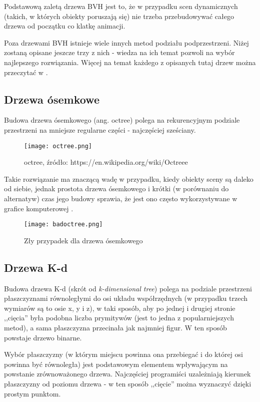 Podstawową zaletą drzewa BVH jest to, że w przypadku scen dynamicznych (takich, w których obiekty poruszają się) nie trzeba przebudowywać całego drzewa od początku co klatkę animacji.


Poza drzewami BVH istnieje wiele innych metod podziału podprzestrzeni. Niżej zostaną opisane jeszcze trzy z nich - wiedza na ich temat pozwoli na wybór najlepszego rozwiązania. Więcej na temat każdego z opisanych tutaj drzew można przeczytać w \cite{trees, dunn02}.

\subsection{Drzewa ósemkowe}

Budowa drzewa ósemkowego (ang. octree) polega na rekurencyjnym podziale przestrzeni na mniejsze regularne części - najczęściej sześciany.

\begin{figure}[H]
\centering
  \texttt{[image: octree.png]}
  \caption{octree, źródło: https://en.wikipedia.org/wiki/Octreee}
\end{figure}

Takie rozwiązanie ma znaczącą wadę w przypadku, kiedy obiekty sceny są daleko od siebie, jednak prostota drzewa ósemkowego i krótki (w porównaniu do alternatyw) czas jego budowy sprawia, że jest ono często wykorzystywane w grafice komputerowej \cite{octree1, octree2}.

\begin{figure}[H]
\centering
  \texttt{[image: badoctree.png]}
  \caption{Zły przypadek dla drzewa ósemkowego}
\end{figure}

\subsection{Drzewa K-d}

Budowa drzewa K-d (skrót od \emph{k-dimensional tree}) polega na podziale przestrzeni płaszczyznami równoległymi do osi układu współrzędnych (w przypadku trzech wymiarów są to osie x, y i z), w taki sposób, aby po jednej i drugiej stronie ,,cięcia'' była podobna liczba prymitywów (jest to jedna z popularniejszych metod), a sama płaszczyzna przecinała jak najmniej figur. W ten sposób powstaje drzewo binarne.

Wybór płaszczyzny (w którym miejscu powinna ona przebiegać i do której osi powinna być równoległa) jest podstawowym elementem wpływającym na powstanie zrównoważonego drzewa. Najczęściej programiści uzależniają kierunek płaszczyzny od poziomu drzewa - w ten sposób ,,cięcie'' można wyznaczyć dzięki prostym punktom.

